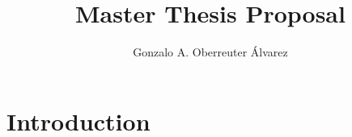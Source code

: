 \documentclass[%
  chapterprefix=false,%
  open=right,%
  twoside=true,%
  paper=a4,%
  logofile={Figures/logo.png},%
  thesistype=master,%
  UKenglish,%
]{se2thesis}
\author{Gonzalo A. Oberreuter Álvarez}
\title{Master Thesis Proposal}
\institute{Chair of Software Engineering}
\begin{document}
\frontmatter

\maketitle

\mainmatter{}

\chapter{Introduction}
\end{document}
